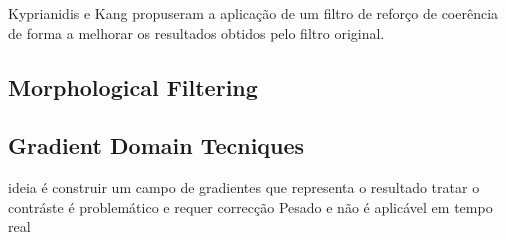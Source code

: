 Kyprianidis e Kang \cite{KK} propuseram a aplicação de um filtro de reforço de coerência de forma a melhorar os resultados obtidos pelo filtro original.

\subsection{Morphological Filtering}

\subsection{Gradient Domain Tecniques}
ideia é construir um campo de gradientes que representa o resultado tratar o contráste é problemático e requer correcção
Pesado e não é aplicável em tempo real